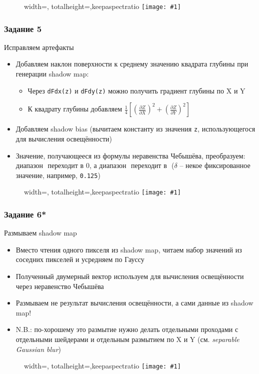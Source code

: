\documentclass{beamer}
\newcommand{\slideimage}[1]{
  \begin{figure}
    \begin{adjustbox}{width=\textwidth, totalheight=\textheight-2\baselineskip-2\baselineskip,keepaspectratio}
      \texttt{[image: \#1]}
    \end{adjustbox}
  \end{figure}
}
\begin{document}
\begin{frame}[fragile]
\slideimage{4.png}
\end{frame}

\begin{frame}[fragile]
\frametitle{Задание 5}
Исправляем артефакты
\begin{itemize}
\item Добавляем наклон поверхности к среднему значению квадрата глубины при генерации shadow map:
\begin{itemize}
\item Через \verb|dFdx(z)| и \verb|dFdy(z)| можно получить градиент глубины по X и Y
\item К квадрату глубины добавляем \begin{math}\frac{1}{4}\left[\left(\frac{\partial Z}{\partial X}\right)^2 + \left(\frac{\partial Z}{\partial Y}\right)^2\right]\end{math}
\end{itemize}
\item Добавляем shadow bias (вычитаем константу из значения \verb|z|, использующегося для вычисления освещённости)
\item Значение, получающееся из формулы неравенства Чебышёва, преобразуем: диапазон \begin{math}[0, \delta]\end{math} переходит в \begin{math}0\end{math}, а диапазон \begin{math}[\delta, 1]\end{math} переходит в \begin{math}[0, 1]\end{math} (\begin{math}\delta\end{math} -- некое фиксированное значение, например, \verb|0.125|)
\end{itemize}
\end{frame}

\begin{frame}[fragile]
\slideimage{5.png}
\end{frame}

\begin{frame}[fragile]
\frametitle{Задание 6*}
Размываем shadow map
\begin{itemize}
\item Вместо чтения одного пикселя из shadow map, читаем набор значений из соседних пикселей и усредняем по Гауссу
\item Полученный двумерный вектор используем для вычисления освещённости через неравенство Чебышёва
\item Размываем не результат вычисления освещённости, а сами данные из shadow map!
\item {\color{red}N.B.}: по-хорошему это размытие нужно делать отдельными проходами с отдельными шейдерами и отдельным размытием по X и Y (см. \textit{separable Gaussian blur})
\end{itemize}
\end{frame}

\begin{frame}[fragile]
\slideimage{6.png}
\end{frame}
\end{document}
